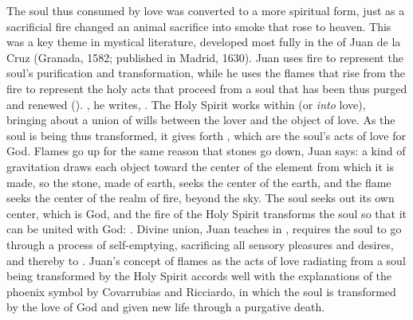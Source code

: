 The soul thus consumed by love was converted to a more spiritual form, just as
a sacrificial fire changed an animal sacrifice into smoke that rose to heaven.
This was a key theme in mystical literature, developed most fully in the
 of Juan de la Cruz (Granada, 1582; published in
Madrid, 1630).
Juan uses fire to represent the soul's purification and transformation, while
he uses the flames that rise from the fire to represent the holy acts that
proceed from a soul that has been thus purged and renewed
().
, he writes, .%
    \Autocite[790]{JuandelaCruz:Llama} 
The Holy Spirit works within  (or
\emph{into} love), bringing about a union of wills between the lover and the
object of love.
As the soul is being thus transformed, it gives forth , which
are the soul's acts of love for God.
Flames go up for the same reason that stones go down, Juan says: a kind of
gravitation draws each object toward the center of the element from which it is
made, so the stone, made of earth, seeks the center of the earth, and the flame
seeks the center of the realm of fire, beyond the sky.%
    \Autocite[792--795]{JuandelaCruz:Llama}
The soul seeks out its own center, which is God, and the fire of the Holy
Spirit transforms the soul so that it can be united with God: .%
    \Autocite[791]{JuandelaCruz:Llama} 
Divine union, Juan teaches in , requires the
soul to go through a process of self-emptying, sacrificing all sensory
pleasures and desires, and thereby to .%
    \Autocite[191]{JuandelaCruz:Subida}
Juan's concept of flames as the acts of love radiating from a soul being
transformed by the Holy Spirit accords well with the explanations of the
phoenix symbol by Covarrubias and Ricciardo, in which the soul is transformed by
the love of God and given new life through a purgative death.


